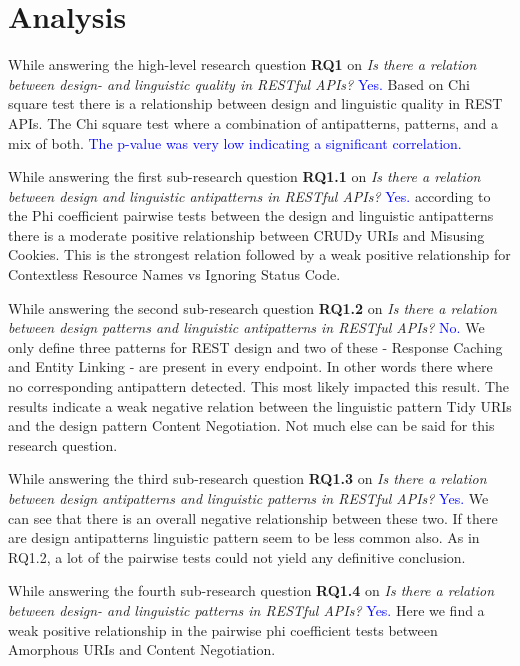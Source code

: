 \section{Analysis}

While answering the high-level research question  \textbf{RQ1} on \textit{Is there a relation between design- and linguistic quality in RESTful APIs?} \textcolor{blue}{Yes.} Based on Chi square test there is a relationship between design and linguistic quality in REST APIs. The Chi square test where a combination of antipatterns, patterns, and a mix of both. \textcolor{blue}{The p-value was very low indicating a significant correlation.}

While answering the first sub-research question \textbf{RQ1.1} on \textit{Is there a relation between design and linguistic antipatterns in RESTful APIs?} \textcolor{blue}{Yes.} according to the Phi coefficient pairwise tests between the design and linguistic antipatterns there is a moderate positive relationship between CRUDy URIs and Misusing Cookies. This is the strongest relation followed by a weak positive relationship for Contextless Resource Names vs Ignoring Status Code.

While answering the second sub-research question \textbf{RQ1.2} on \textit{Is there a relation between design patterns and linguistic antipatterns in RESTful APIs?} \textcolor{blue}{No.} We only define three patterns for REST design and two of these - Response Caching and  Entity Linking - are present in every endpoint. In other words there where no corresponding antipattern detected. This most likely impacted this result. The results indicate a weak negative relation between the linguistic pattern Tidy URIs and the design pattern Content Negotiation. Not much else can be said for this research question.

While answering the third sub-research question  \textbf{RQ1.3} on \textit{Is there a relation between design antipatterns and linguistic patterns in RESTful APIs?} \textcolor{blue}{Yes.} We can see that there is an overall negative relationship between these two. If there are design antipatterns linguistic pattern seem to be less common also. As in RQ1.2, a lot of the pairwise tests could not yield any definitive conclusion.

While answering the fourth sub-research question \textbf{RQ1.4} on \textit{Is there a relation between design- and linguistic patterns in RESTful APIs?} \textcolor{blue}{Yes.} Here we find a weak positive relationship in the pairwise phi coefficient tests between Amorphous URIs and Content Negotiation.

\newpage